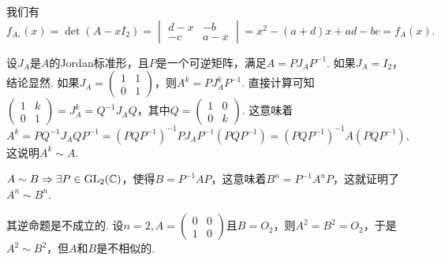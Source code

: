 \begin{solution}
  我们有
  \[
    f_{A_\ast}(x) = \det (A - xI_2) = \begin{vmatrix}
      d - x & -b \\
      -c & a - x
    \end{vmatrix} = x^2 - (a + d)x + ad - bc = f_A(x).
  \]
\end{solution}

\setcounter{solution}{8}

\begin{solution}
  设$J_A$是$A$的Jordan标准形，且$P$是一个可逆矩阵，满足$A=PJ_AP^{-1}$. 如果$J_A=I_2$，结论显然. 如果$J_A=\begin{pmatrix}
    1 & 1 \\
    0 & 1
  \end{pmatrix}$，则$A^k=PJ_A^kP^{-1}$. 直接计算可知$\begin{pmatrix}
    1 & k \\
    0 & 1
  \end{pmatrix}=J_A^k=Q^{-1}J_AQ$，其中$Q=\begin{pmatrix}
    1 & 0 \\
    0 & k
  \end{pmatrix}$. 这意味着
  \[
    A^k = PQ^{-1}J_AQP^{-1} = (PQP^{-1})^{-1}PJ_AP^{-1}(PQP^{-1}) =
    (PQP^{-1})^{-1}A(PQP^{-1}),
  \]
  这说明$A^k\sim A$.
\end{solution}

\begin{solution}
  $A\sim B\Rightarrow \exists P\in\operatorname{GL}_2(\mathbb C)$，使得$B=P^{-1}AP$，这意味着$B^n=P^{-1}A^nP$，这就证明了$A^n\sim B^n$.

  其逆命题是不成立的. 设$n=2,A=\begin{pmatrix}
    0 & 0 \\
    1 & 0
  \end{pmatrix}$且$B=O_2$，则$A^2=B^2=O_2$，于是$A^2\sim B^2$，但$A$和$B$是不相似的.
\end{solution}

\setcounter{solution}{11}

